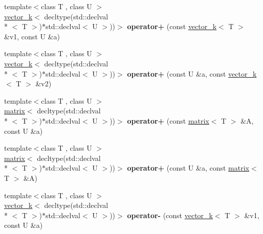 \begin{DoxyCompactItemize}
\item 
\hypertarget{namespacekeycpp_a68fe0fe851bce021be6a0609da7df82d}{{\footnotesize template$<$class T , class U $>$ }\\\hyperlink{classkeycpp_1_1vector__k}{vector\-\_\-k}$<$ decltype(std\-::declval\\*
$<$ T $>$)$\ast$std\-::declval$<$ U $>$))$>$ {\bfseries operator+} (const \hyperlink{classkeycpp_1_1vector__k}{vector\-\_\-k}$<$ T $>$ \&v1, const U \&a)}\label{namespacekeycpp_a68fe0fe851bce021be6a0609da7df82d}

\item 
\hypertarget{namespacekeycpp_af28312b8c309091f03e373e1ae5f3d46}{{\footnotesize template$<$class T , class U $>$ }\\\hyperlink{classkeycpp_1_1vector__k}{vector\-\_\-k}$<$ decltype(std\-::declval\\*
$<$ T $>$)$\ast$std\-::declval$<$ U $>$))$>$ {\bfseries operator+} (const U \&a, const \hyperlink{classkeycpp_1_1vector__k}{vector\-\_\-k}$<$ T $>$ \&v2)}\label{namespacekeycpp_af28312b8c309091f03e373e1ae5f3d46}

\item 
\hypertarget{namespacekeycpp_adff86e062c6497110b7505b0ef715c2c}{{\footnotesize template$<$class T , class U $>$ }\\\hyperlink{classkeycpp_1_1matrix}{matrix}$<$ decltype(std\-::declval\\*
$<$ T $>$)$\ast$std\-::declval$<$ U $>$))$>$ {\bfseries operator+} (const \hyperlink{classkeycpp_1_1matrix}{matrix}$<$ T $>$ \&A, const U \&a)}\label{namespacekeycpp_adff86e062c6497110b7505b0ef715c2c}

\item 
\hypertarget{namespacekeycpp_a4b4a64905c9d681c174b2dfcfba272c4}{{\footnotesize template$<$class T , class U $>$ }\\\hyperlink{classkeycpp_1_1matrix}{matrix}$<$ decltype(std\-::declval\\*
$<$ T $>$)$\ast$std\-::declval$<$ U $>$))$>$ {\bfseries operator+} (const U \&a, const \hyperlink{classkeycpp_1_1matrix}{matrix}$<$ T $>$ \&A)}\label{namespacekeycpp_a4b4a64905c9d681c174b2dfcfba272c4}

\item 
\hypertarget{namespacekeycpp_a520b72efca1fbe800845b21a84d2d472}{{\footnotesize template$<$class T , class U $>$ }\\\hyperlink{classkeycpp_1_1vector__k}{vector\-\_\-k}$<$ decltype(std\-::declval\\*
$<$ T $>$)$\ast$std\-::declval$<$ U $>$))$>$ {\bfseries operator-\/} (const \hyperlink{classkeycpp_1_1vector__k}{vector\-\_\-k}$<$ T $>$ \&v1, const U \&a)}\label{namespacekeycpp_a520b72efca1fbe800845b21a84d2d472}


\end{DoxyCompactItemize}
